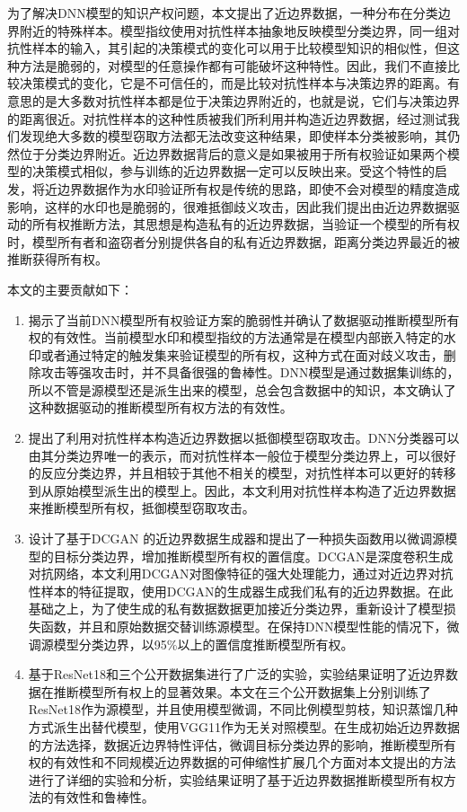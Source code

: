 为了解决DNN模型的知识产权问题，本文提出了近边界数据，一种分布在分类边界附近的特殊样本。模型指纹\cite{cao2021ipguard}使用对抗性样本抽象地反映模型分类边界，同一组对抗性样本的输入，其引起的决策模式的变化可以用于比较模型知识的相似性，但这种方法是脆弱的，对模型的任意操作都有可能破坏这种特性。因此，我们不直接比较决策模式的变化，它是不可信任的，而是比较对抗性样本与决策边界的距离。有意思的是大多数对抗性样本都是位于决策边界附近的，也就是说，它们与决策边界的距离很近。对抗性样本的这种性质被我们所利用并构造近边界数据，经过测试我们发现绝大多数的模型窃取方法都无法改变这种结果，即使样本分类被影响，其仍然位于分类边界附近。近边界数据背后的意义是如果被用于所有权验证如果两个模型的决策模式相似，参与训练的近边界数据一定可以反映出来。受这个特性的启发，将近边界数据作为水印验证所有权是传统的思路，即使不会对模型的精度造成影响，这样的水印也是脆弱的，很难抵御歧义攻击，因此我们提出由近边界数据驱动的所有权推断方法，其思想是构造私有的近边界数据，当验证一个模型的所有权时，模型所有者和盗窃者分别提供各自的私有近边界数据，距离分类边界最近的被推断获得所有权。

本文的主要贡献如下：

\begin{enumerate}
	\renewcommand{\labelenumi}{\theenumi)}
	\item 揭示了当前DNN模型所有权验证方案的脆弱性并确认了数据驱动推断模型所有权的有效性。当前模型水印和模型指纹的方法通常是在模型内部嵌入特定的水印或者通过特定的触发集来验证模型的所有权，这种方式在面对歧义攻击，删除攻击等强攻击时，并不具备很强的鲁棒性。DNN模型是通过数据集训练的，所以不管是源模型还是派生出来的模型，总会包含数据中的知识，本文确认了这种数据驱动的推断模型所有权方法的有效性。
	\item 提出了利用对抗性样本构造近边界数据以抵御模型窃取攻击。DNN分类器可以由其分类边界唯一的表示，而对抗性样本一般位于模型分类边界上，可以很好的反应分类边界，并且相较于其他不相关的模型，对抗性样本可以更好的转移到从原始模型派生出的模型上。因此，本文利用对抗性样本构造了近边界数据来推断模型所有权，抵御模型窃取攻击。
	\item 设计了基于DCGAN 的近边界数据生成器和提出了一种损失函数用以微调源模型的目标分类边界，增加推断模型所有权的置信度。DCGAN是深度卷积生成对抗网络，本文利用DCGAN对图像特征的强大处理能力，通过对近边界对抗性样本的特征提取，使用DCGAN的生成器生成我们私有的近边界数据。在此基础之上，为了使生成的私有数据数据更加接近分类边界，重新设计了模型损失函数，并且和原始数据交替训练源模型。在保持DNN模型性能的情况下，微调源模型分类边界，以95\%以上的置信度推断模型所有权。
	\item 基于ResNet18\cite{he2016deep}和三个公开数据集进行了广泛的实验，实验结果证明了近边界数据在推断模型所有权上的显著效果。本文在三个公开数据集上分别训练了ResNet18作为源模型，并且使用模型微调，不同比例模型剪枝，知识蒸馏几种方式派生出替代模型，使用VGG11\cite{simonyan2014very}作为无关对照模型。在生成初始近边界数据的方法选择，数据近边界特性评估，微调目标分类边界的影响，推断模型所有权的有效性和不同规模近边界数据的可伸缩性扩展几个方面对本文提出的方法进行了详细的实验和分析，实验结果证明了基于近边界数据推断模型所有权方法的有效性和鲁棒性。
\end{enumerate}


